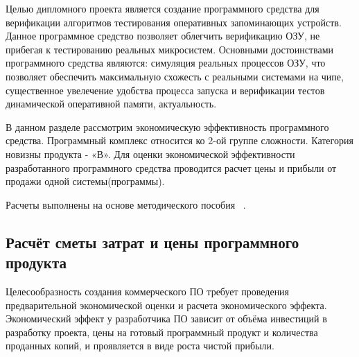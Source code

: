 








Целью дипломного проекта является создание программного средства для верификации алгоритмов тестирования оперативных запоминающих устройств.
Данное программное средство позволяет облегчить верификацию ОЗУ, не прибегая к тестированию реальных микросистем. Основными достоинствами программного средства являются: симуляция реальных процессов ОЗУ, что позволяет обеспечить максимальную схожесть с реальными системами на чипе, существенное увелечение удобства процесса запуска и верификации тестов динамической оперативной памяти, актуальность.

В данном разделе рассмотрим экономическую эффективность программного средства. Программный комплекс относится ко 2-ой группе сложности. Категория новизны продукта - «В».
Для оценки экономической эффективности разработанного программного средства проводится расчет цены и прибыли от продажи одной системы(программы).

Расчеты выполнены на основе методического пособия ~\cite{palicyn_2006}.

\subsection{Расчёт сметы затрат и цены программного продукта}

Целесообразность создания коммерческого ПО требует проведения предварительной экономической оценки и расчета экономического эффекта.
Экономический эффект у разработчика ПО зависит от объёма инвестиций в разработку проекта, цены на готовый программный продукт и количества проданных копий, и проявляется в виде роста чистой прибыли.

